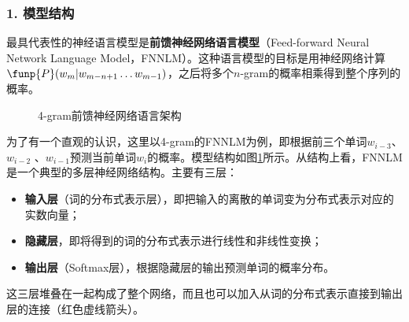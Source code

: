 
\subsubsection{1. 模型结构}

\parinterval  最具代表性的神经语言模型是{\small\sffamily\bfseries{前馈神经网络语言模型}}（Feed-forward Neural Network Language Model，FNNLM）。这种语言模型的目标是用神经网络计算$ \funp{P}(w_m|w_{m-n+1}
\\\dots w_{m-1}) $，之后将多个$n$-gram的概率相乘得到整个序列的概率。

\begin{figure}[htp]
\centering

\caption{4-gram前馈神经网络语言架构}
\label{fig:9-60}
\end{figure}

\parinterval  为了有一个直观的认识，这里以4-gram的FNNLM为例，即根据前三个单词$ w_{i-3} $、 $ w_{i-2} $ 、$ w_{i-1} $预测当前单词$ w_i $的概率。模型结构如图\ref{fig:9-60}所示。从结构上看，FNNLM是一个典型的多层神经网络结构。主要有三层：

\begin{itemize}
\vspace{0.3em}
\item {\small\sffamily\bfseries{输入层}}（词的分布式表示层），即把输入的离散的单词变为分布式表示对应的实数向量；
\vspace{0.3em}
\item {\small\sffamily\bfseries{隐藏层}}，即将得到的词的分布式表示进行线性和非线性变换；
\vspace{0.3em}
\item {\small\sffamily\bfseries{输出层}}（Softmax层），根据隐藏层的输出预测单词的概率分布。
\vspace{0.3em}
\end{itemize}

\parinterval  这三层堆叠在一起构成了整个网络，而且也可以加入从词的分布式表示直接到输出层的连接（红色虚线箭头）。


